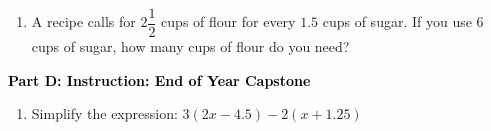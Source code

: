 \documentclass[12pt, letterpaper, fleqn]{article}
\newcommand{\blank}{\underline{\hspace{2.2cm}}}
\begin{document}
\begin{enumerate}[itemsep=2.2cm, leftmargin=0.6cm, resume]
\item A recipe calls for $2\dfrac{1}{2}$ cups of flour for every $1.5$ cups of sugar. If you use 6 cups of sugar, how many cups of flour do you need? \blank
\end{enumerate}

\newpage

\begin{tcolorbox}[colback=customteal!20]
\large\textcolor{black}{\textbf{Part D: Instruction: End of Year Capstone}}
\end{tcolorbox}

\vspace{3mm}

\begin{enumerate}[itemsep=2.2cm, leftmargin=0.6cm, resume]
\item Simplify the expression: $3(2x - 4.5) - 2(x + 1.25)$ \blank
\end{enumerate}
\end{document}
